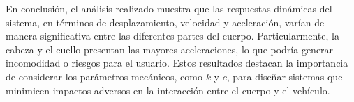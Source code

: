 En conclusión, el análisis realizado muestra que las respuestas dinámicas del  
sistema, en términos de desplazamiento, velocidad y aceleración, varían de  
manera significativa entre las diferentes partes del cuerpo. Particularmente,  
la cabeza y el cuello presentan las mayores aceleraciones, lo que podría  
generar incomodidad o riesgos para el usuario. Estos resultados destacan la  
importancia de considerar los parámetros mecánicos, como \( k \) y \( c \),  
para diseñar sistemas que minimicen impactos adversos en la interacción entre  
el cuerpo y el vehículo.  
